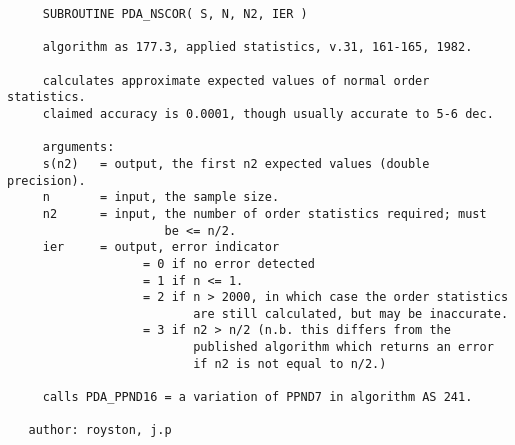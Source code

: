 \begin{verbatim}
     SUBROUTINE PDA_NSCOR( S, N, N2, IER )

     algorithm as 177.3, applied statistics, v.31, 161-165, 1982.

     calculates approximate expected values of normal order statistics.
     claimed accuracy is 0.0001, though usually accurate to 5-6 dec.

     arguments:
     s(n2)   = output, the first n2 expected values (double precision).
     n       = input, the sample size.
     n2      = input, the number of order statistics required; must
                      be <= n/2.
     ier     = output, error indicator
                   = 0 if no error detected
                   = 1 if n <= 1.
                   = 2 if n > 2000, in which case the order statistics
                          are still calculated, but may be inaccurate.
                   = 3 if n2 > n/2 (n.b. this differs from the
                          published algorithm which returns an error
                          if n2 is not equal to n/2.)

     calls PDA_PPND16 = a variation of PPND7 in algorithm AS 241.

   author: royston, j.p

\end{verbatim}


